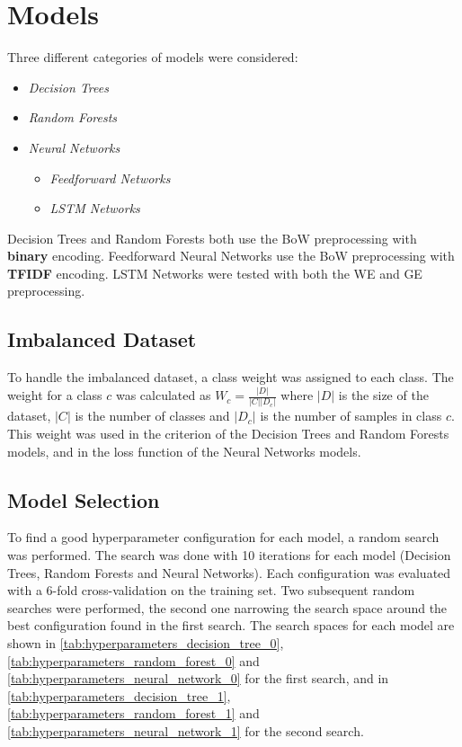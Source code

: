\section{Models}
\label{sec:models}
Three different categories of models were
considered:
\begin{itemize}
    \item \textit{Decision Trees}
    \item \textit{Random Forests}
    \item \textit{Neural Networks}
    \begin{itemize}
        \item \textit{Feedforward Networks}
        \item \textit{LSTM Networks}
    \end{itemize}
\end{itemize}
Decision Trees and Random Forests both use
the BoW preprocessing with \textbf{binary} 
encoding.
Feedforward Neural Networks use the BoW
preprocessing with \textbf{TFIDF} encoding.
LSTM Networks were tested with both the
WE and GE preprocessing.

\subsection{Imbalanced Dataset}
To handle the imbalanced dataset, a class
weight was assigned to each class. The weight
for a class $c$ was calculated as
$W_c=\frac{|D|}{|C||D_c|}$ where $|D|$ is
the size of the dataset, $|C|$ is the number
of classes and $|D_c|$ is the number of
samples in class $c$. This weight was used in
the criterion of the Decision Trees and Random
Forests models, and in the loss function of
the Neural Networks models.

\subsection{Model Selection}
To find a good hyperparameter configuration
for each model, a random search was performed.
The search was done with 10 iterations for
each model (Decision Trees, Random Forests 
and Neural Networks). Each configuration was
evaluated with a 6-fold cross-validation on
the training set. Two subsequent random
searches were performed, the second one
narrowing the search space around the best
configuration found in the first search.
The search spaces for each model are shown
in \autoref{tab:hyperparameters_decision_tree_0}, 
\autoref{tab:hyperparameters_random_forest_0} and 
\autoref{tab:hyperparameters_neural_network_0} for the 
first search, and in 
\autoref{tab:hyperparameters_decision_tree_1},
\autoref{tab:hyperparameters_random_forest_1} and
\autoref{tab:hyperparameters_neural_network_1} for the
second search.

